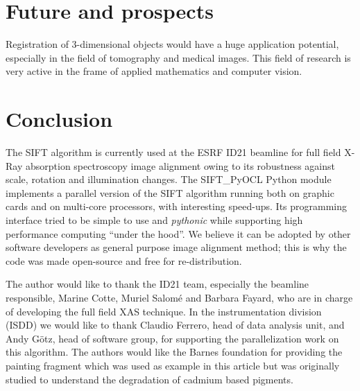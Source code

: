 \documentclass[preprint]{iucr}
\begin{document}
\section{Future and prospects}


Registration of 3-dimensional objects would have a huge application potential,
especially in the field of tomography and medical images.
This field of research is very active in the frame of applied mathematics and
computer vision.


\section{Conclusion}

The SIFT algorithm is currently used at the ESRF ID21 beamline for full field
X-Ray absorption spectroscopy image alignment owing to its robustness against
scale, rotation and illumination changes.
The SIFT\_PyOCL Python module implements a parallel version of the SIFT
algorithm running both on graphic cards and on multi-core processors, with
interesting speed-ups.
Its programming interface tried to be simple to use and \emph{pythonic} while
supporting high performance computing ``under the hood''.
We believe it can be adopted by other software developers as general purpose
image alignment method; this is why the code was made open-source and free for
re-distribution.



The author would like to thank the ID21 team, especially the beamline
responsible, Marine Cotte, Muriel Salomé and Barbara Fayard, who are in charge
of developing the full field XAS technique.
In the instrumentation division (ISDD) we would like to thank Claudio Ferrero,
head of data analysis unit, and Andy G\"otz, head of software group, for
supporting the parallelization work on this algorithm.
The authors would like the Barnes foundation for providing the painting fragment
which was used as example in this article but was originally studied to
understand the degradation of cadmium based pigments.


\end{document}
